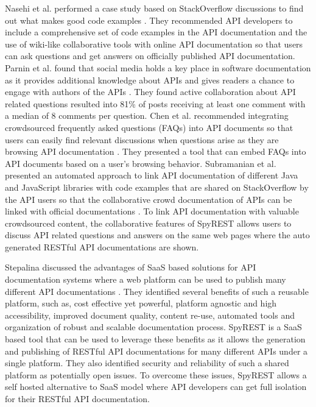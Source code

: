 \documentclass[conference]{IEEEtran}
\begin{document}
Nasehi et al. performed a case study based on StackOverflow discussions to find out what makes good code examples \cite{Nasehi_what_makes}. They recommended API developers to include a comprehensive set of code examples in the API documentation and the use of wiki-like collaborative tools with online API documentation so that users can ask questions and get answers on officially published API documentation. Parnin et al. found that social media holds a key place in software documentation as  it provides additional knowledge about APIs and gives readers a chance to engage with authors of the APIs \cite{Parnin_measuring}. They found active collaboration about API related questions resulted into 81\% of posts receiving at least one comment with a median of 8 comments per question. Chen et al. recommended integrating crowdsourced frequently asked questions (FAQs) into API documents so that users can easily find relevant discussions when questions arise as they are browsing API documentation \cite{Chen_who_asked}. They presented a tool that can embed FAQs into API documents based on a user's browsing behavior. Subramanian et al. presented an automated approach to link API documentation of different Java and JavaScript libraries with code examples that are shared on StackOverflow by the API users so that the collaborative crowd documentation of APIs can be linked with official documentations \cite{Subramanian_live}. To link API documentation with valuable crowdsourced content, the collaborative features of SpyREST allows users to discuss API related questions and answers on the same web pages where the auto generated RESTful API documentations are shown.

Stepalina discussed the advantages of SaaS based solutions for API documentation systems where a web platform can be used to publish many different API documentations \cite{Stepalina_saas}. They identified several benefits of such a reusable platform, such as, cost effective yet powerful, platform agnostic and high accessibility, improved document quality, content re-use, automated tools and organization of robust and scalable documentation process. SpyREST is a SaaS based tool that can be used to leverage these benefits as it allows the generation and publishing of RESTful API documentations for many different APIs under a single platform. They also identified security and reliability of such a shared platform as potentially open issues. To overcome these issues, SpyREST allows a self hosted alternative to SaaS model where API developers can get full isolation for their RESTful API documentation.
\end{document}
